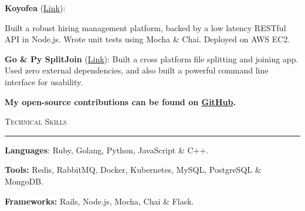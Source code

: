\documentclass[a4paper, 12pt]{article}
\begin{document}
\textbf{Koyofea} (\href{https://github.com/IamRaviTejaG/koyofea-back}{\color{veronica}Link}): {Built a robust hiring management platform, backed by a low latency RESTful API in Node.js. Wrote unit tests using Mocha \& Chai. Deployed on AWS EC2. \newline\vspace{-0.5cm}

\textbf{Go \& Py SplitJoin} (\href{https://github.com/IamRaviTejaG/go-split-join}{\color{veronica}Link}): Built a cross platform file splitting and joining app. Used zero external dependencies, and also built a powerful command line interface for usability.\newline\vspace{-0.3cm}

\textbf{My open-source contributions can be found on \href{https://github.com/search?q=is\%3Apr+author\%3AIamRaviTejaG-zz+author\%3AIamRaviTejaG}{\color{veronica}GitHub}.}\newline
\vspace{0cm}



\Large{\textsc{Technical Skills}}\vspace{-0.5cm}\newline
\rule{19cm}{0.01cm}
\vspace{0.2cm}
\newline
\large
\textbf{Languages}: Ruby, Golang, Python, JavaScript \& C++.\newline\vspace{-0.5cm}

\textbf{Tools:}  Redis, RabbitMQ, Docker, Kubernetes, MySQL, PostgreSQL \& MongoDB.\newline\vspace{-0.5cm}

\textbf{Frameworks:}  Rails, Node.js, Mocha, Chai \& Flask.




}
\end{document}
